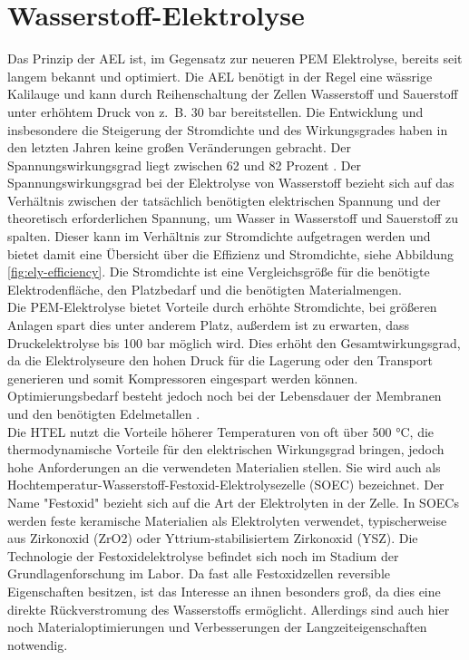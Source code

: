 \section{Wasserstoff-Elektrolyse}
\label{sec:Elektrolyse}
Das Prinzip der \gls{AEL} ist, im Gegensatz zur neueren \gls{PEM} Elektrolyse, bereits seit langem bekannt und optimiert. Die \gls{AEL} benötigt in der Regel eine wässrige Kalilauge und kann durch Reihenschaltung der Zellen Wasserstoff und Sauerstoff unter erhöhtem Druck von z.~B. 30 bar bereitstellen. Die Entwicklung und insbesondere die Steigerung der Stromdichte und des Wirkungsgrades haben in den letzten Jahren keine großen Veränderungen gebracht. Der Spannungswirkungsgrad liegt zwischen 62 und 82 Prozent \cite{NOWH2}. Der Spannungswirkungsgrad bei der Elektrolyse von Wasserstoff bezieht sich auf das Verhältnis zwischen der tatsächlich benötigten elektrischen Spannung und der theoretisch erforderlichen Spannung, um Wasser in Wasserstoff und Sauerstoff zu spalten. Dieser kann im Verhältnis zur Stromdichte aufgetragen werden und bietet damit eine Übersicht über die Effizienz und Stromdichte, siehe Abbildung \ref{fig:ely-efficiency}. Die Stromdichte ist eine Vergleichsgröße für die benötigte Elektrodenfläche, den Platzbedarf und die benötigten Materialmengen.\\
Die \gls{PEM}-Elektrolyse bietet Vorteile durch erhöhte Stromdichte, bei größeren Anlagen spart dies unter anderem Platz, außerdem ist zu erwarten, dass Druckelektrolyse bis 100 bar möglich wird. Dies erhöht den Gesamtwirkungsgrad, da die Elektrolyseure den hohen Druck für die Lagerung oder den Transport generieren und somit Kompressoren eingespart werden können. Optimierungsbedarf besteht jedoch noch bei der Lebensdauer der Membranen und den benötigten Edelmetallen \cite{NOWH2}. \\
Die \gls{HTEL} nutzt die Vorteile höherer Temperaturen von oft über 500 °C, die thermodynamische Vorteile für den elektrischen Wirkungsgrad bringen, jedoch hohe Anforderungen an die verwendeten Materialien stellen. Sie wird auch als Hochtemperatur-Wasserstoff-Festoxid-Elektrolysezelle (SOEC) bezeichnet. Der Name "Festoxid" bezieht sich auf die Art der Elektrolyten in der Zelle. In SOECs werden feste keramische Materialien als Elektrolyten verwendet, typischerweise aus Zirkonoxid (ZrO2) oder Yttrium-stabilisiertem Zirkonoxid (YSZ). Die Technologie der Festoxidelektrolyse befindet sich noch im Stadium der Grundlagenforschung im Labor. Da fast alle Festoxidzellen reversible Eigenschaften besitzen, ist das Interesse an ihnen besonders groß, da dies eine direkte Rückverstromung des Wasserstoffs ermöglicht. Allerdings sind auch hier noch Materialoptimierungen und Verbesserungen der Langzeiteigenschaften notwendig.\\
